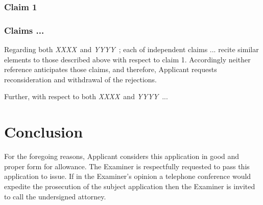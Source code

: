 \documentclass[11pt,letterpaper,oneside]{article}
\newcommand{\xxxx}{{\em XXXX}\ }
\newcommand{\yyyy}{{\em YYYY}\ }
\begin{document}
{\subsubsection{Claim 1}





\subsubsection{Claims ...}

Regarding both \xxxx and \yyyy; each of independent
claims ... recite similar elements to those described above
with respect to claim 1.  Accordingly neither reference anticipates
those claims, and therefore, Applicant requests reconsideration and
withdrawal of the rejections.

Further, with respect to both \xxxx and \yyyy...

\section{Conclusion}

For the foregoing reasons, Applicant considers this application in good
and proper form for allowance.  The Examiner is respectfully requested
to pass this application to issue.  If in the Examiner's opinion a
telephone conference would expedite the prosecution of the subject
application then the Examiner is invited to call the undersigned
attorney.\\


} %

\Signature


\end{document}
